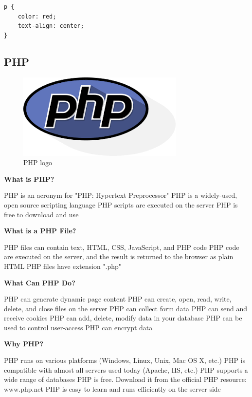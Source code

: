 \begin{verbatim}
p {
    color: red;
    text-align: center;
} 
\end{verbatim}


\subsection{PHP}
\begin{figure}[h!]
\centering \includegraphics[scale=0.50]{input/images/php.png}
\caption{PHP logo}
\end{figure}
 {\bf What is PHP?}

    PHP is an acronym for "PHP: Hypertext Preprocessor"
    PHP is a widely-used, open source scripting language
    PHP scripts are executed on the server
    PHP is free to download and use

 {\bf What is a PHP File?}

    PHP files can contain text, HTML, CSS, JavaScript, and PHP code
    PHP code are executed on the server, and the result is returned to the browser as plain HTML
    PHP files have extension ".php"

 {\bf What Can PHP Do?}

    PHP can generate dynamic page content
    PHP can create, open, read, write, delete, and close files on the server
    PHP can collect form data
    PHP can send and receive cookies
    PHP can add, delete, modify data in your database
    PHP can be used to control user-access
    PHP can encrypt data

  {\bf Why PHP?}

    PHP runs on various platforms (Windows, Linux, Unix, Mac OS X, etc.)
    PHP is compatible with almost all servers used today (Apache, IIS, etc.)
    PHP supports a wide range of databases
    PHP is free. Download it from the official PHP resource: www.php.net
    PHP is easy to learn and runs efficiently on the server side

